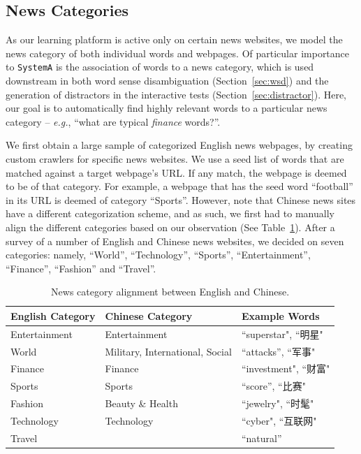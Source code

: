 \begin{CJK}{UTF8}{gbsn}
\subsection{News Categories}
\label{subsec:category}
As our learning platform is active only on certain news websites, we
model the news category of both individual words and webpages. Of
particular importance to {\tt SystemA} is the association of words to a
news category, which is used downstream in both word sense
disambiguation (Section~\ref{sec:wsd}) and the generation of
distractors in the interactive tests (Section~\ref{sec:distractor}).
Here, our goal is to automatically find highly relevant words to a
particular news category -- {\it e.g.}, ``what are typical {\it finance}
words?''.  

We first obtain a large sample of categorized English news webpages,
by creating custom crawlers for specific news websites.  We use a seed
list of words that are matched against a target webpage's URL.  If any
match, the webpage is deemed to be of that category.  For example, a
webpage that has the seed word ``football'' in its URL is deemed of
category ``Sports''.  However, note that Chinese news sites have a
different categorization scheme, and as such, we first had to manually
align the different categories based on our observation (See
Table~\ref{table:cat}).  After a survey of a number of English and
Chinese news websites, we decided on seven categories: namely,
``World'', ``Technology'', ``Sports'', ``Entertainment'', ``Finance'',
``Fashion'' and ``Travel''.
 

\begin{table}[ht]
\centering
  \caption{News category alignment between English and Chinese.}
  \label{table:cat}
  \begin{tabular}{| p{2.2cm} | p{2.2cm} | p{1.8cm} |}
    \hline
    {\bf English \qquad Category} & {\bf Chinese \qquad Category} & {\bf Example Words}\\
    \hline
    Entertainment & Entertainment & ``superstar", ``明星"\\
    \hline
     World &  Military, \qquad International, Social & ``attacks'', ``军事"  \\
    \hline
    Finance & Finance & ``investment", ``财富"\\
    \hline
    Sports & Sports & ``score'', ``比赛" \\
    \hline
    Fashion &  Beauty \& Health & ``jewelry", ``时髦"\\
    \hline
    Technology & Technology  & ``cyber", ``互联网"\\ \hline
    Travel  &  & ``natural'' \\
    \hline
  \end{tabular}
\end{table}




\end{CJK}
